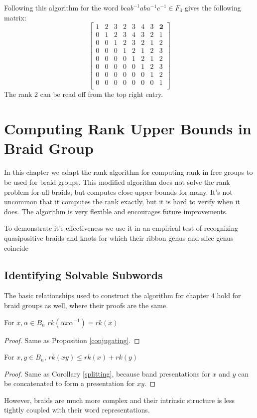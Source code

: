 \documentclass[12pt]{thesis}
\begin{document}
\begin{example}
    Following this algorithm for the word $bcab^{-1}aba^{-1}c^{-1} \in F_{3}$ gives the following matrix:
\[
\begin{bmatrix}
    1 & 2 & 3 & 2 & 3 & 4 & 3 & \boldsymbol{2} \\ 
    0 & 1 & 2 & 3 & 4 & 3 & 2 & 1 \\
    0 & 0 & 1 & 2 & 3 & 2 & 1 & 2 \\
    0 & 0 & 0 & 1 & 2 & 1 & 2 & 3 \\
    0 & 0 & 0 & 0 & 1 & 2 & 1 & 2 \\
    0 & 0 & 0 & 0 & 0 & 1 & 2 & 3 \\
    0 & 0 & 0 & 0 & 0 & 0 & 1 & 2 \\
    0 & 0 & 0 & 0 & 0 & 0 & 0 & 1 \\
\end{bmatrix}
\]
The rank 2 can be read off from the top right entry.
\end{example}

\chapter{Computing Rank Upper Bounds in Braid Group}

\label{chap:braid-rank}

In this chapter we adapt the rank algorithm for computing
rank in free groups to be used for braid groups.
This modified algorithm does not solve the rank problem for all braids,
but computes close upper bounds for many.
It's not uncommon that it computes the rank exactly,
but it is hard to verify when it does.
The algorithm is very flexible and encourages future improvements.

To demonstrate it's effectiveness we use it in an empirical
test of recognizing quasipositive braids and knots for which their ribbon genus
and slice genus coincide

\section{Identifying Solvable Subwords}

The basic relationships used to construct the algorithm for chapter 4 hold for braid
groups as well, where their proofs are the same.
\begin{proposition}
    For $x, \alpha \in B_{n}$
         $rk(\alpha x \alpha^{-1}) = rk(x)$   
\end{proposition}
\begin{proof}
 Same as Proposition \ref{conjugating}.
\end{proof}
\begin{proposition}
    For $x, y \in B_{n}$,
    $rk(xy) \leq rk(x) + rk(y)$ 
\end{proposition}
\begin{proof}
  Same as Corollary \ref{splitting},
 because band presentations for $x$ and $y$
can be concatenated to form a presentation for $xy$.
\end{proof}
However, braids are much more complex and their intrinsic structure
is less tightly coupled with their word representations.
\end{document}
